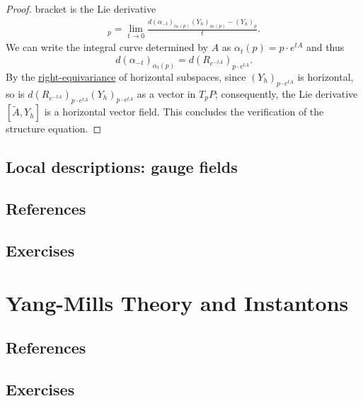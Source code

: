\documentclass{book}
\theoremstyle{plain}
\theoremstyle{definition}
\theoremstyle{remark}
\begin{document}
\begin{proof}
    bracket is the Lie derivative
    \begin{align*}
        [\tilde A, Y_h]_p=\lim_{t\to 0}\frac{d(\alpha_{-t})_{\alpha_t(p)}(Y_h)_{\alpha_t(p)}-(Y_h)_p}{t}.
    \end{align*}
    We can write the integral curve determined by $A$ as $\alpha_t(p)=p\cdot e^{tA}$ and thus
    \[d(\alpha_{-t})_{\alpha_t(p)}=d(R_{e^{-tA}})_{p\cdot e^{tA}}.\]
    By the \hyperref[defn:conn]{right-equivariance} of horizontal subspaces, since $(Y_h)_{p\cdot e^{tA}}$ is horizontal,
    so is $d(R_{e^{-tA}})_{p\cdot e^{tA}}(Y_h)_{p\cdot e^{tA}}$ as a vector in $T_pP$; consequently, the Lie derivative $[\tilde A,Y_h]$ is a
    horizontal vector field. This concludes the verification of the structure equation.
\end{proof}




\section{Local descriptions: gauge fields}
\section{References}
\section{Exercises}













\chapter{Yang-Mills Theory and Instantons}
\section{References}
\section{Exercises}
\end{document}
